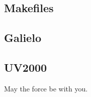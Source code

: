 \documentclass[a4paper,12pt]{article}
\begin{document}
\begin{appendices}

\section{Makefiles} \label{app:makefiles}
\subsection{Galielo}


\newpage
\subsection{UV2000}


\end{appendices}



May the force be with you.

\end{document}
